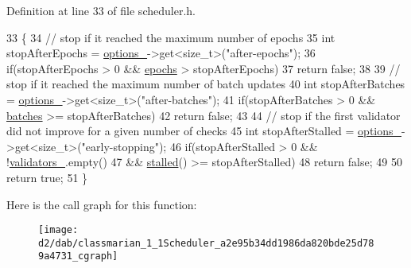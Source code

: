 Definition at line 33 of file scheduler.\+h.


\begin{DoxyCode}
33                    \{
34     \textcolor{comment}{// stop if it reached the maximum number of epochs}
35     \textcolor{keywordtype}{int} stopAfterEpochs = \hyperlink{classmarian_1_1Scheduler_a82aeb8a4ec08a364bec7c6aac6a25e01}{options\_}->get<\textcolor{keywordtype}{size\_t}>(\textcolor{stringliteral}{"after-epochs"});
36     \textcolor{keywordflow}{if}(stopAfterEpochs > 0 && \hyperlink{classmarian_1_1Scheduler_af63f13e7b7219211e9b1e353f36000fa}{epochs} > stopAfterEpochs)
37       \textcolor{keywordflow}{return} \textcolor{keyword}{false};
38 
39     \textcolor{comment}{// stop if it reached the maximum number of batch updates}
40     \textcolor{keywordtype}{int} stopAfterBatches = \hyperlink{classmarian_1_1Scheduler_a82aeb8a4ec08a364bec7c6aac6a25e01}{options\_}->get<\textcolor{keywordtype}{size\_t}>(\textcolor{stringliteral}{"after-batches"});
41     \textcolor{keywordflow}{if}(stopAfterBatches > 0 && \hyperlink{classmarian_1_1Scheduler_a3a226357e546863179c3b635dd10de39}{batches} >= stopAfterBatches)
42       \textcolor{keywordflow}{return} \textcolor{keyword}{false};
43 
44     \textcolor{comment}{// stop if the first validator did not improve for a given number of checks}
45     \textcolor{keywordtype}{int} stopAfterStalled = \hyperlink{classmarian_1_1Scheduler_a82aeb8a4ec08a364bec7c6aac6a25e01}{options\_}->get<\textcolor{keywordtype}{size\_t}>(\textcolor{stringliteral}{"early-stopping"});
46     \textcolor{keywordflow}{if}(stopAfterStalled > 0 && !\hyperlink{classmarian_1_1Scheduler_aaaad6769ded3ed1fa5e307cde44fecdf}{validators\_}.empty()
47        && \hyperlink{classmarian_1_1Scheduler_a4cf4975987ba59c33d01d4d29d2f3dbd}{stalled}() >= stopAfterStalled)
48       \textcolor{keywordflow}{return} \textcolor{keyword}{false};
49 
50     \textcolor{keywordflow}{return} \textcolor{keyword}{true};
51   \}
\end{DoxyCode}


Here is the call graph for this function\+:
\nopagebreak
\begin{figure}[H]
\begin{center}
\leavevmode
\texttt{[image: d2/dab/classmarian\_1\_1Scheduler\_a2e95b34dd1986da820bde25d789a4731\_cgraph]}
\end{center}
\end{figure}


